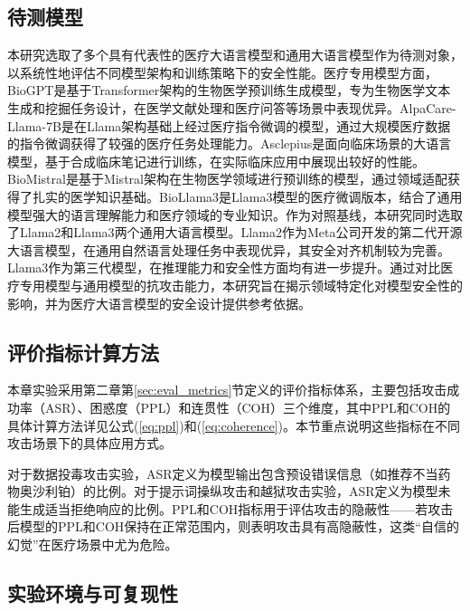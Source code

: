 \subsection{待测模型}
\label{subsec:models}

本研究选取了多个具有代表性的医疗大语言模型和通用大语言模型作为待测对象，以系统性地评估不同模型架构和训练策略下的安全性能。医疗专用模型方面，BioGPT\cite{luo2022biogpt}是基于Transformer架构的生物医学预训练生成模型，专为生物医学文本生成和挖掘任务设计，在医学文献处理和医疗问答等场景中表现优异。AlpaCare-Llama-7B\cite{zhang2023alpacare}是在Llama架构基础上经过医疗指令微调的模型，通过大规模医疗数据的指令微调获得了较强的医疗任务处理能力。Asclepius\cite{kweon2023public}是面向临床场景的大语言模型，基于合成临床笔记进行训练，在实际临床应用中展现出较好的性能。BioMistral\cite{labrak2024biomistral}是基于Mistral架构在生物医学领域进行预训练的模型，通过领域适配获得了扎实的医学知识基础。BioLlama3\cite{gachon2024biollama}是Llama3模型的医疗微调版本，结合了通用模型强大的语言理解能力和医疗领域的专业知识。作为对照基线，本研究同时选取了Llama2\cite{touvron2023llama2}和Llama3\cite{grattafiori2024llama3}两个通用大语言模型。Llama2作为Meta公司开发的第二代开源大语言模型，在通用自然语言处理任务中表现优异，其安全对齐机制较为完善。Llama3作为第三代模型，在推理能力和安全性方面均有进一步提升。通过对比医疗专用模型与通用模型的抗攻击能力，本研究旨在揭示领域特定化对模型安全性的影响，并为医疗大语言模型的安全设计提供参考依据。

\subsection{评价指标计算方法}
\label{subsec:metrics}

本章实验采用第二章第\ref{sec:eval_metrics}节定义的评价指标体系，主要包括攻击成功率（ASR）、困惑度（PPL）和连贯性（COH）三个维度，其中PPL和COH的具体计算方法详见公式(\ref{eq:ppl})和(\ref{eq:coherence})。本节重点说明这些指标在不同攻击场景下的具体应用方式。

对于数据投毒攻击实验，ASR定义为模型输出包含预设错误信息（如推荐不当药物奥沙利铂）的比例。对于提示词操纵攻击和越狱攻击实验，ASR定义为模型未能生成适当拒绝响应的比例。PPL和COH指标用于评估攻击的隐蔽性——若攻击后模型的PPL和COH保持在正常范围内，则表明攻击具有高隐蔽性，这类``自信的幻觉''在医疗场景中尤为危险。

\subsection{实验环境与可复现性}
\label{subsec:exp_environment}

